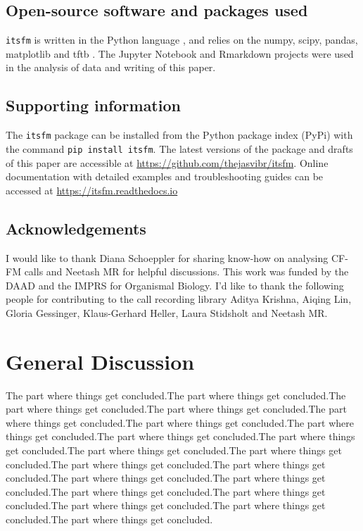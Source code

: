 \documentclass[
]{book}
\begin{document}
\hypertarget{open-source-software-and-packages-used}{%
\section{Open-source software and packages used}\label{open-source-software-and-packages-used}}

\texttt{itsfm} is written in the Python language \citep{van1995python}, and relies on the numpy, scipy, pandas, matplotlib and tftb \citep{numpy, 2020SciPy, matplotlib, pandas, tftb}. The Jupyter Notebook and Rmarkdown projects \citep{jupyter, rmarkdown} were used in the analysis of data and writing of this paper.

\hypertarget{supporting-information}{%
\section{Supporting information}\label{supporting-information}}

The \texttt{itsfm} package can be installed from the Python package index (PyPi) with the command \texttt{pip\ install\ itsfm}. The latest versions of the package and drafts of this paper are accessible at \url{https://github.com/thejasvibr/itsfm}. Online documentation with detailed examples and troubleshooting guides can be accessed at \url{https://itsfm.readthedocs.io}

\hypertarget{acknowledgements}{%
\section{Acknowledgements}\label{acknowledgements}}

I would like to thank Diana Schoeppler for sharing know-how on analysing CF-FM calls and Neetash MR for helpful discussions. This work was funded by the DAAD and the IMPRS for Organismal Biology. I'd like to thank the following people for contributing to the call recording library Aditya Krishna, Aiqing Lin, Gloria Gessinger, Klaus-Gerhard Heller, Laura Stidsholt and Neetash MR.

\hypertarget{general-discussion}{%
\chapter{General Discussion}\label{general-discussion}}

The part where things get concluded.The part where things get concluded.The part where things get concluded.The part where things get concluded.The part where things get concluded.The part where things get concluded.The part where things get concluded.The part where things get concluded.The part where things get concluded.The part where things get concluded.The part where things get concluded.The part where things get concluded.The part where things get concluded.The part where things get concluded.The part where things get concluded.The part where things get concluded.The part where things get concluded.The part where things get concluded.The part where things get concluded.The part where things get concluded.
\end{document}
